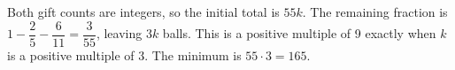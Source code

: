 Both gift counts are integers, so the initial total is $55k$. The remaining fraction is $1-\dfrac{2}{5}-\dfrac{6}{11}=\dfrac{3}{55}$, leaving $3k$ balls. This is a positive multiple of 9 exactly when $k$ is a positive multiple of 3. The minimum is $55\cdot3=\boxed{165}$.

